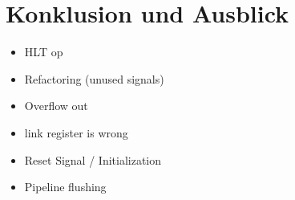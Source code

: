 \documentclass[paper=a4,fontsize=10pt]{scrreprt}
\begin{document}
\chapter{Konklusion und Ausblick}
\begin{itemize}
    \item HLT op
    \item Refactoring (unused signals)
    \item Overflow out
    \item link register is wrong
    \item Reset Signal / Initialization
    \item Pipeline flushing
\end{itemize}
\end{document}
